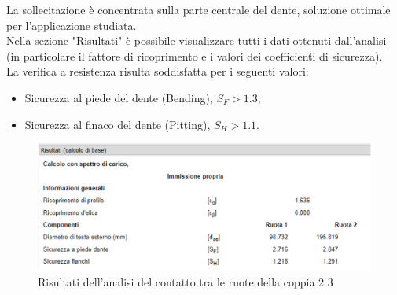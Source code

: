 La sollecitazione è concentrata sulla parte centrale del dente, soluzione ottimale per l’applicazione studiata.\\
\newpage
Nella sezione "Risultati" è possibile visualizzare tutti i dati ottenuti dall’analisi (in particolare il fattore di ricoprimento e i valori dei coefficienti di sicurezza). \\
La verifica a resistenza risulta soddisfatta per i seguenti valori:
\begin{itemize}
    \item Sicurezza al piede del dente (Bending), $S_F>1.3$;
    \item Sicurezza al finaco del dente (Pitting), $S_H>1.1$.
\end{itemize}
\begin{figure}[h]
    \centering
    \includegraphics[scale=0.49]{Immagini/RisultatiCoppia23.png}
    \caption{Risultati dell'analisi del contatto tra le ruote della coppia 2 3}
    \label{fig:RisultatiCoppia23}
\end{figure}

